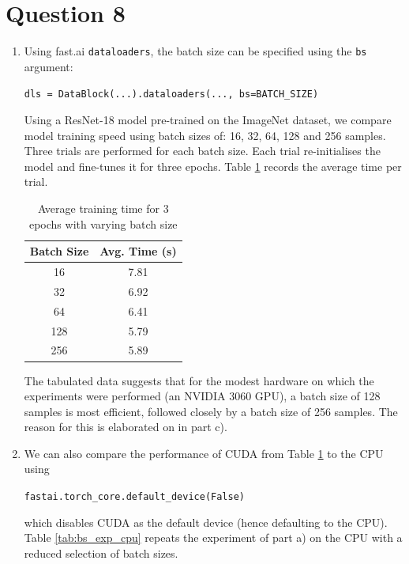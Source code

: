 \section*{Question 8}

\begin{enumerate}[label=\alph*)]

    \item Using fast.ai \texttt{dataloaders}, the batch size can be specified using the \texttt{bs} argument:
    \begin{center}
        \texttt{dls = DataBlock(...).dataloaders(..., bs=BATCH\_SIZE)}
    \end{center}
    Using a ResNet-18 model pre-trained on the ImageNet dataset, we compare model training speed using batch sizes of: 16, 32, 64, 128 and 256 samples. Three trials are performed for each batch size. Each trial re-initialises the model and fine-tunes it for three epochs. Table \ref{tab:bs_exp} records the average time per trial.

    \begin{table}[ht]
        \small \centering {}
        \caption{Average training time for 3 epochs with varying batch size}
        \begin{tabularx}{0.33\textwidth}{c c}
            \toprule
            \textbf{Batch Size} & \textbf{Avg. Time (s)} \\
            \midrule
             16 & 7.81 \\
             32 & 6.92 \\
             64 & 6.41 \\
            128 & 5.79 \\
            256 & 5.89 \\
            \bottomrule
        \end{tabularx}
        \label{tab:bs_exp}
    \end{table}

    The tabulated data suggests that for the modest hardware on which the experiments were performed (an NVIDIA 3060 GPU), a batch size of 128 samples is most efficient, followed closely by a batch size of 256 samples. The reason for this is elaborated on in part c).

    \item We can also compare the performance of CUDA from Table \ref{tab:bs_exp} to the CPU using
    \begin{center}
        \texttt{fastai.torch\_core.default\_device(False)}
    \end{center}
    which disables CUDA as the default device (hence defaulting to the CPU). Table \ref{tab:bs_exp_cpu} repeats the experiment of part a) on the CPU with a reduced selection of batch sizes.


\end{enumerate}
